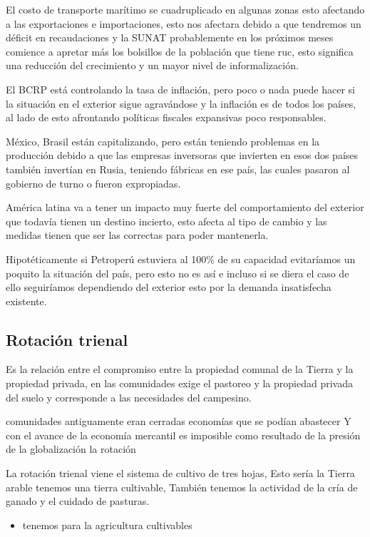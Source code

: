 \documentclass[
  letterpaper,
  DIV=11,
  numbers=noendperiod]{scrartcl}
\providecommand{\tightlist}{%
  \setlength{\itemsep}{0pt}\setlength{\parskip}{0pt}}\usepackage{longtable,booktabs,array}
\begin{document}
El costo de transporte marítimo se cuadruplicado en algunas zonas esto
afectando a las exportaciones e importaciones, esto nos afectara debido
a que tendremos un déficit en recaudaciones y la SUNAT probablemente en
los próximos meses comience a apretar más los bolsillos de la población
que tiene ruc, esto significa una reducción del crecimiento y un mayor
nivel de informalización.

El BCRP está controlando la tasa de inflación, pero poco o nada puede
hacer si la situación en el exterior sigue agravándose y la inflación es
de todos los países, al lado de esto afrontando políticas fiscales
expansivas poco responsables.

México, Brasil están capitalizando, pero están teniendo problemas en la
producción debido a que las empresas inversoras que invierten en esos
dos países también invertían en Rusia, teniendo fábricas en ese país,
las cuales pasaron al gobierno de turno o fueron expropiadas.

América latina va a tener un impacto muy fuerte del comportamiento del
exterior que todavía tienen un destino incierto, esto afecta al tipo de
cambio y las medidas tienen que ser las correctas para poder mantenerla.

Hipotéticamente si Petroperú estuviera al 100\% de su capacidad
evitaríamos un poquito la situación del país, pero esto no es así e
incluso si se diera el caso de ello seguiríamos dependiendo del exterior
esto por la demanda insatisfecha existente.

\hypertarget{rotaciuxf3n-trienal}{%
\subsection{Rotación trienal}\label{rotaciuxf3n-trienal}}

Es la relación entre el compromiso entre la propiedad comunal de la
Tierra y la propiedad privada, en las comunidades exige el pastoreo y la
propiedad privada del suelo y corresponde a las necesidades del
campesino.

comunidades antiguamente eran cerradas economías que se podían abastecer
Y con el avance de la economía mercantil es imposible como resultado de
la presión de la globalización la rotación

La rotación trienal viene el sistema de cultivo de tres hojas, Esto
sería la Tierra arable tenemos una tierra cultivable, También tenemos la
actividad de la cría de ganado y el cuidado de pasturas.

\begin{itemize}
\tightlist
\item
  tenemos para la agricultura cultivables
\end{itemize}
\end{document}
